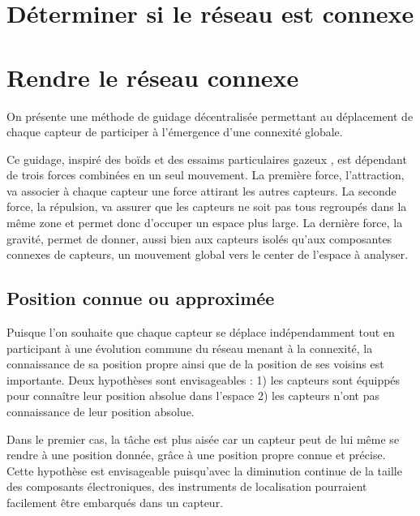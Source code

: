 \documentclass[10pt]{article}
\newcommand{\drawSensor}[4]{
  \draw[fill=#4] (#1,#2) circle (0.1);
  \draw[dashed,#4] (#1,#2) circle (#3);
}
\begin{document}
\begin{multicols}{2}
\begin{figure}[H]

  \caption{}
  \label{}

\end{figure}

\section{Déterminer si le réseau est connexe}

\section{Rendre le réseau connexe}

On présente une méthode de guidage décentralisée permettant au
déplacement de chaque capteur de participer à l'émergence d'une
connexité globale.

Ce guidage, inspiré des boïds \cite{Reynolds1987} et des essaims
particulaires gazeux \cite{Cheng2011497}, est dépendant de trois
forces combinées en un seul mouvement. La première force,
l'attraction, va associer à chaque capteur une force attirant les
autres capteurs. La seconde force, la répulsion, va assurer que les
capteurs ne soit pas tous regroupés dans la même zone et permet donc
d'occuper un espace plus large. La dernière force, la gravité, permet
de donner, aussi bien aux capteurs isolés qu'aux composantes connexes
de capteurs, un mouvement global vers le center de l'espace à
analyser.

\subsection{Position connue ou approximée}

Puisque l'on souhaite que chaque capteur se déplace indépendamment
tout en participant à une évolution commune du réseau menant à la
connexité, la connaissance de sa position propre ainsi que de la
position de ses voisins est importante. Deux hypothèses sont
envisageables : 1) les capteurs sont équippés pour connaître leur
position absolue dans l'espace 2) les capteurs n'ont pas connaissance
de leur position absolue.

Dans le premier cas, la tâche est plus aisée car un capteur peut de
lui même se rendre à une position donnée, grâce à une position propre
connue et précise. Cette hypothèse est envisageable puisqu'avec la
diminution continue de la taille des composants électroniques, des
instruments de localisation pourraient facilement être embarqués dans
un capteur.


\end{multicols}
\end{document}
